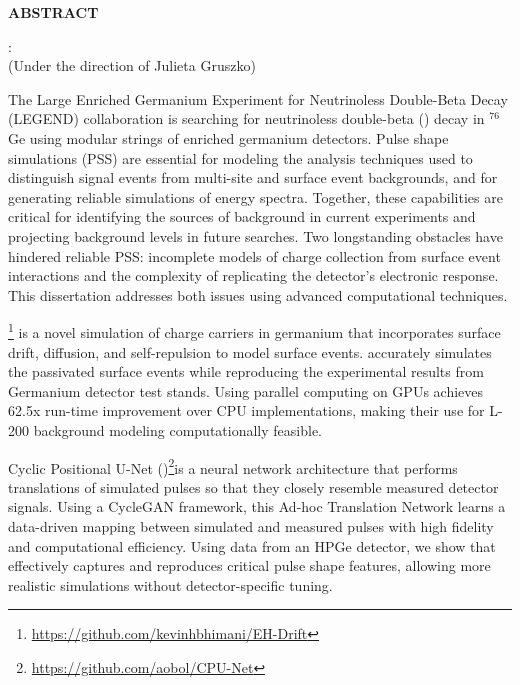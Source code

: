 \begin{center}
\vspace*{52pt}
{\normalfont\textbf{ABSTRACT}}
\vspace{11pt}

\begin{singlespace}
{\authorname}: {\thesistitle}\\
(Under the direction of Julieta Gruszko)
\end{singlespace}
\end{center}

The Large Enriched Germanium Experiment for Neutrinoless Double-Beta Decay (LEGEND) collaboration is searching for neutrinoless double-beta ({\onbb}) decay in ${}^{76}$Ge using modular strings of enriched germanium detectors. Pulse shape simulations (PSS) are essential for modeling the analysis techniques used to distinguish signal events from multi-site and surface event backgrounds, and for generating reliable simulations of energy spectra. Together, these capabilities are critical for identifying the sources of background in current experiments and projecting background levels in future searches. Two longstanding obstacles have hindered reliable PSS: incomplete models of charge collection from surface event interactions and the complexity of replicating the detector’s electronic response. This dissertation addresses both issues using advanced computational techniques.

{\ehd}\footnote{\url{https://github.com/kevinhbhimani/EH-Drift}} is a novel simulation of charge carriers in germanium that incorporates surface drift, diffusion, and self-repulsion to model surface events. {\ehd} accurately simulates the passivated surface events while reproducing the experimental results from Germanium detector test stands. Using parallel computing on GPUs {\ehd} achieves 62.5x run-time improvement over CPU implementations, making their use for L-200 background modeling computationally feasible.

Cyclic Positional U-Net ({\cpunet})\footnote{\url{https://github.com/aobol/CPU-Net}}is a neural network architecture that performs translations of simulated pulses so that they closely resemble measured detector signals. Using a CycleGAN framework, this Ad-hoc Translation Network learns a data-driven mapping between simulated and measured pulses with high fidelity and computational efficiency. Using data from an HPGe detector, we show that {\cpunet} effectively captures and reproduces critical pulse shape features, allowing more realistic simulations without detector-specific tuning.
